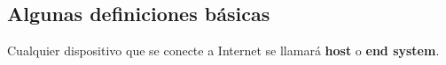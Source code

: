 
\subsection{Algunas definiciones básicas}

Cualquier dispositivo que se conecte a Internet se llamará \textbf{host} o \textbf{end system}.

